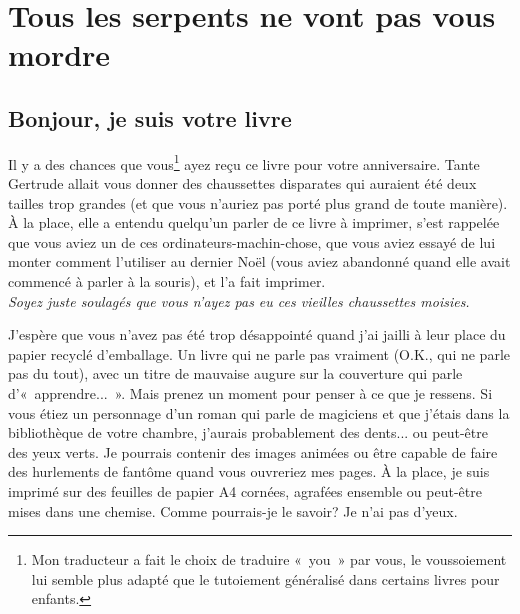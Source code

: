 


\mainmatter
\clearemptydoublepage
\chapter{Tous les serpents ne vont pas vous mor\-dre}
\section{Bonjour, je suis votre livre}
Il y a des chances que vous\footnote{Mon traducteur a fait le choix de traduire « you » par vous, le voussoiement lui semble plus adapté que le tutoiement généralisé dans certains livres pour enfants.} ayez reçu ce livre pour votre anniversaire. Tante Gertrude allait vous donner des chaussettes disparates qui auraient été deux tailles trop grandes (et que vous n'auriez pas porté plus grand de toute manière). À la place, elle a entendu quelqu'un parler de ce livre à imprimer, s'est rappelée que vous aviez un de ces ordinateurs-machin-chose, que vous aviez essayé de lui monter comment l'utiliser au dernier Noël (vous aviez abandonné quand elle avait commencé à parler à la souris), et l'a fait imprimer.
\\


\emph{Soyez juste soulagés que vous n'ayez pas eu ces vieilles chaussettes moisies.\\}


J'espère que vous n'avez pas été trop désappointé quand j'ai jailli à leur place du papier recyclé d'emballage.
Un livre qui ne parle pas vraiment (O.K., qui ne parle pas du tout), avec un titre de mauvaise augure sur la couverture 
qui parle d'« apprendre... ». Mais prenez un moment pour penser à ce que je ressens. Si vous étiez un personnage d'un roman qui parle de magiciens et que j'étais dans la bibliothèque de votre chambre, j'aurais probablement des dents... ou peut-être des yeux verts. Je pourrais contenir des images animées ou être capable de faire des hurlements de fantôme quand vous ouvreriez mes pages. À la place, je suis imprimé sur des feuilles de papier A4 cornées, agrafées ensemble ou peut-être mises dans une chemise. Comme pourrais-je le savoir? Je n'ai pas d'yeux.\\


